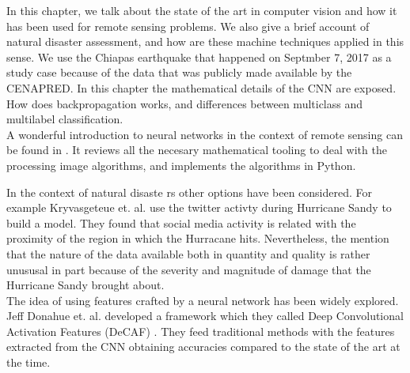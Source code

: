 In this chapter, we talk about the state of the art in computer vision and how it has been used for remote sensing problems. We also give a brief account of natural disaster assessment, and how are these machine techniques applied in this sense. We use the Chiapas earthquake that happened on Septmber 7, 2017 as a study case because of the data that was publicly made available by the CENAPRED. In this chapter the mathematical details of the CNN are exposed. How does backpropagation works, and differences between multiclass and multilabel classification.\\



A wonderful introduction to neural networks in the context of remote sensing can be found in \cite{canty2014image}. It reviews all the necesary mathematical tooling to deal with the processing image algorithms, and implements the algorithms in Python. 

In the context of natural disaste rs other options have been considered. For example Kryvasgeteue et. al. use the twitter activty during  Hurricane Sandy to build a model. They found that social media activity is related with the proximity of the region in which the Hurracane hits\cite{Kryvasheyeue1500779}. Nevertheless, the mention that the nature of the data available both in quantity and quality is rather unususal in part because of the severity and magnitude of damage that the Hurricane Sandy brought about.\\

The idea of using features crafted by a neural network has been widely explored. Jeff Donahue et. al. developed a framework which they called Deep Convolutional Activation Features (DeCAF) \cite{DBLP:journals/corr/DonahueJVHZTD13}. They feed traditional methods with the features extracted from the CNN obtaining accuracies compared to the state of the art at the time.\\


